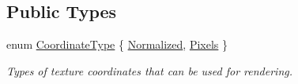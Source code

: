\subsection*{Public Types}
\begin{DoxyCompactItemize}
\item 
enum \hyperlink{classsf_1_1_texture_aa6fd3bbe3c334b3c4428edfb2765a82e}{Coordinate\-Type} \{ \hyperlink{classsf_1_1_texture_aa6fd3bbe3c334b3c4428edfb2765a82ea69d6228950882e4d68be4ba4dbe7df73}{Normalized}, 
\hyperlink{classsf_1_1_texture_aa6fd3bbe3c334b3c4428edfb2765a82ea6372f9c3a10203a7a69d8d5da59d82ff}{Pixels}
 \}
\begin{DoxyCompactList}\small\item\em Types of texture coordinates that can be used for rendering. \end{DoxyCompactList}\end{DoxyCompactItemize}
